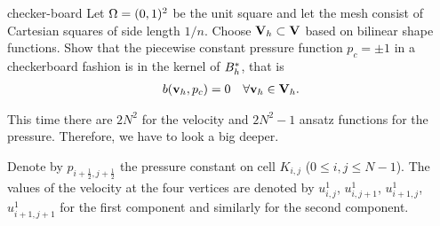\begin{Problem}{checker-board}
  Let $\Omega = (0,1)^2$ be the unit square and let the mesh consist
  of Cartesian squares of side length $1/n$. Choose $\mathbf V_h \subset \mathbf V$
  based on bilinear shape functions. Show that the piecewise constant
  pressure function $p_c=\pm 1$ in a checkerboard fashion is in the
  kernel of $B_h^*$, that is
  \begin{gather}
    b(\mathbf v_h, p_c) = 0 \quad\forall \mathbf v_h\in \mathbf V_h.
  \end{gather}
\begin{solution}
This time there are $2N^2$ for the velocity and $2N^2-1$ ansatz functions for
the pressure. Therefore, we have to look a big deeper.

Denote by $p_{i+\frac12, j+\frac12}$ the pressure constant on cell $K_{i,j}$
($0\leq i,j \leq N-1$). The values of the velocity at the four vertices are
denoted by $u^1_{i,j}$, $u^1_{i,j+1}$, $u^1_{i+1,j}$, $u^1_{i+1,j+1}$ for the
first component and similarly for the second component.


\end{solution}
\end{Problem}
